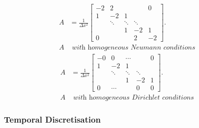 \begin{multicols}{2}
\begin{equation}\label{Aneumann}
    \begin{split}
A&=\frac{1}{\Delta x^2}\begin{bmatrix}
   -2&  2&  &  & 0\\
   1&  -2&  1&  & \\
   &  \ddots&  \ddots&  \ddots& \\
   &  &  1&  -2& 1\\
   0&  &  &  2& -2
  \end{bmatrix}.\\
  A &\textit{ with homogeneous Neumann conditions}
    \end{split}
\end{equation}
\break
\begin{equation}\label{Adirichlet}
    \begin{split}
A&=\frac{1}{\Delta x^2}\begin{bmatrix}
   -0&  0& \cdots &  & 0\\
   1&  -2&  1&  & \\
   &  \ddots&  \ddots&  \ddots& \\
   &  &  1&  -2& 1\\
   0&\cdots  &  &  0& 0
  \end{bmatrix}.\\
  A & \textit{ with homogeneous Dirichlet conditions}
    \end{split}
\end{equation}
\end{multicols}

\subsubsection{Temporal Discretisation}
